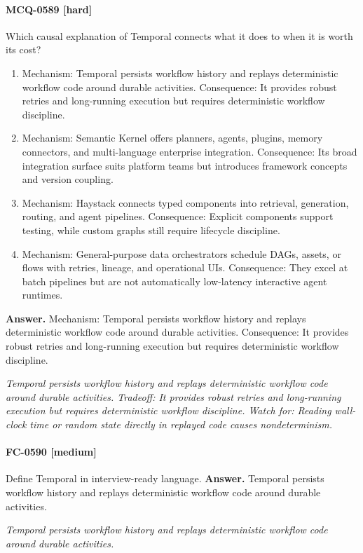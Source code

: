 \paragraph{MCQ-0589 [hard]} Which causal explanation of Temporal connects what it does to when it is worth its cost?
\begin{enumerate}[label=\Alph*.]
\item Mechanism: Temporal persists workflow history and replays deterministic workflow code around durable activities. Consequence: It provides robust retries and long-running execution but requires deterministic workflow discipline.
\item Mechanism: Semantic Kernel offers planners, agents, plugins, memory connectors, and multi-language enterprise integration. Consequence: Its broad integration surface suits platform teams but introduces framework concepts and version coupling.
\item Mechanism: Haystack connects typed components into retrieval, generation, routing, and agent pipelines. Consequence: Explicit components support testing, while custom graphs still require lifecycle discipline.
\item Mechanism: General-purpose data orchestrators schedule DAGs, assets, or flows with retries, lineage, and operational UIs. Consequence: They excel at batch pipelines but are not automatically low-latency interactive agent runtimes.
\end{enumerate}
\noindent\textbf{Answer.} Mechanism: Temporal persists workflow history and replays deterministic workflow code around durable activities. Consequence: It provides robust retries and long-running execution but requires deterministic workflow discipline.
\par\textit{Temporal persists workflow history and replays deterministic workflow code around durable activities. Tradeoff: It provides robust retries and long-running execution but requires deterministic workflow discipline. Watch for: Reading wall-clock time or random state directly in replayed code causes nondeterminism.}
\paragraph{FC-0590 [medium]} Define Temporal in interview-ready language.
\noindent\textbf{Answer.} Temporal persists workflow history and replays deterministic workflow code around durable activities.
\par\textit{Temporal persists workflow history and replays deterministic workflow code around durable activities.}

